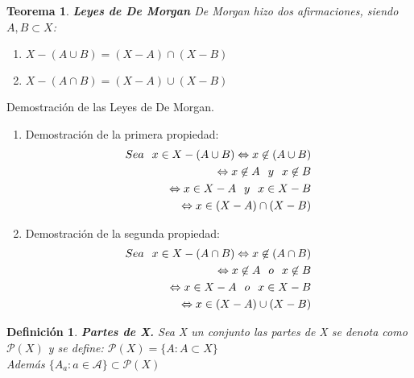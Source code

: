 \documentclass[10pt, a4paper]{article}
\makeatletter
\newenvironment{nlist}
{\begin{enumerate}
    \renewcommand\labelenumi{(\emph{\roman{enumi})}}}
  {\end{enumerate}}
\renewenvironment{proof}[1][\proofname] {\par\pushQED{\qed}\normalfont\topsep6\p@\@plus6\p@\relax\trivlist\item[\hskip\labelsep\itshape\sffamily#1\@addpunct{.}]\ignorespaces}{\popQED\endtrivlist\@endpefalse}
\theoremstyle{theorem-style}
\newtheorem{nth}{Teorema}[section]
\theoremstyle{definition-style}
\newtheorem{ndef}{Definición}[section]
\theoremstyle{remark-style}
\theoremstyle{example-style}
\theoremstyle{definition-style}
\theoremstyle{remark-style}
\makeatother
\begin{document}
\begin{nth}
\textbf{Leyes de De Morgan}
De Morgan hizo dos afirmaciones, siendo $A,B\subset X$:
\begin{nlist}
\item $X-(A\cup B) = (X-A)\cap(X-B)$
\item $X-(A\cap B)= (X-A)\cup(X-B)$
\end{nlist}
\end{nth}
\begin{proof}Demostración de las Leyes de De Morgan.
\begin{nlist} 
\item Demostración de la primera propiedad:
\begin{equation}
\begin{split}
Sea\hspace{0.25cm}x\in X-(A\cup B) \Leftrightarrow x\not\in (A\cup B)\\
\Leftrightarrow x\not\in A \hspace{0.25cm}y\hspace{0.25cm} x\not\in B \\
\Leftrightarrow x\in X-A \hspace{0.25cm}y\hspace{0.25cm} x\in X-B \\
\Leftrightarrow x\in(X-A)\cap(X-B)
\end{split}
\end{equation}
\item Demostración de la segunda propiedad:
\begin{equation}
\begin{split}
Sea\hspace{0.25cm}x\in X-(A\cap B) \Leftrightarrow x\not\in (A\cap B)\\
\Leftrightarrow x\not\in A \hspace{0.25cm}o\hspace{0.25cm} x\not\in B \\
\Leftrightarrow x\in X-A \hspace{0.25cm}o\hspace{0.25cm} x\in X-B \\
\Leftrightarrow x\in(X-A)\cup(X-B)
\end{split}
\end{equation}
\end{nlist}
\end{proof}

\begin{ndef}\textbf{Partes de X.}
Sea X un conjunto las partes de X se denota como $\mathcal{P}(X)$ y se define:
$\mathcal{P}(X)=\{A:A\subset X\}$ \\
Además $\{A_a:a\in\mathcal{A}\}\subset\mathcal{P}(X)$
\end{ndef}
\end{document}
